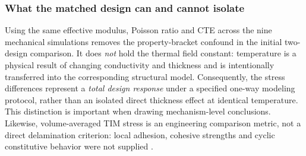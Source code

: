 \documentclass[10pt,a4paper]{article}
\begin{document}
\subsubsection{What the matched design can and cannot isolate}
Using the same effective modulus, Poisson ratio and CTE across the nine mechanical simulations
removes the property-bracket confound in the initial two-design comparison. It does \emph{not}
hold the thermal field constant: temperature is a physical result of changing conductivity and
thickness and is intentionally transferred into the corresponding structural model.
Consequently, the stress differences represent a \emph{total design response} under a
specified one-way modeling protocol, rather than an isolated direct thickness effect at
identical temperature. This distinction is important when drawing mechanism-level conclusions.
Likewise, volume-averaged TIM stress is an engineering comparison metric, not a direct
delamination criterion: local adhesion, cohesive strengths and cyclic constitutive behavior
were not supplied \citep{subramanian2019,yenigun2026}.
\end{document}
